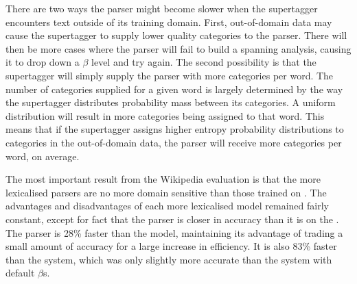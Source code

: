 There are two ways the \candc parser might become slower when the supertagger
encounters text outside of its training domain. First, out-of-domain data may
cause the supertagger to supply lower quality categories to the parser. There
will then be more cases where the parser will fail to build a spanning analysis,
causing it to drop down a $\beta$ level and try again. The second possibility is
that the supertagger will simply supply the parser with more categories per
word. The number of categories supplied for a given word is largely determined
by the way the supertagger distributes probability mass between its categories.
A uniform distribution will result in more categories being assigned to that
word. This means that if the supertagger assigns higher entropy probability
distributions to categories in the out-of-domain data, the parser will receive
more categories per word, on average.

% 



The most important result from the Wikipedia evaluation is that the more lexicalised
parsers are no more domain sensitive than those trained on \ccgbank. The
advantages and disadvantages of each more lexicalised model remained fairly constant,
except for fact that the \trsys parser is closer in accuracy than it is on the
\wsj. The \hatsys parser is 28\% faster than the \ccgbank \hybrid model,
maintaining its advantage of trading a small amount of accuracy for a large
increase in efficiency. It is also 83\% faster than the \ccgbank \optbeta
system, which was only slightly more accurate than the \ccgbank system with
default $\beta$s.

